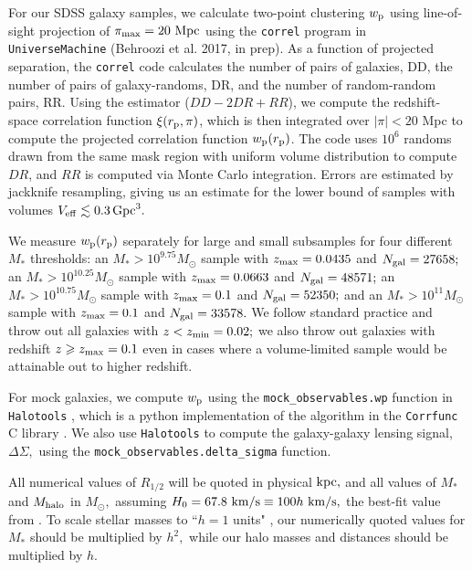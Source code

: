 \documentclass[usenatbib,usegraphicx,letterpaper]{mn2e}
\newcommand{\rhalf}{R_{1/2}}
\newcommand{\mstar}{M_{\ast}}
\newcommand{\mhalo}{M_{\rm halo}}
\newcommand{\rproj}{r_{\rm p}}
\newcommand{\wproj}{w_{\rm p}}
\newcommand{\kpc}{{\rm kpc}}
\newcommand{\mpc}{{\rm Mpc}}
\newcommand{\msun}{M_\odot}
\newcommand{\kms}{{\rm km/s}}
\begin{document}
For our SDSS galaxy samples, we calculate two-point clustering $\wproj$ using line-of-sight projection of $\pi_{\rm max}=20~\mpc$ using the {\tt correl} program in {\tt UniverseMachine} (Behroozi et al. 2017, in prep). As a function of projected separation, the {\tt correl} code calculates the number of pairs of galaxies, DD, the number of pairs of galaxy-randoms, DR, and the number of random-random pairs, RR. Using the \citet{landy_szalay93} estimator ($DD - 2DR + RR$), we compute the redshift-space correlation function $\xi(\rproj, \pi)$, which is then integrated over $\vert\pi\vert < 20$ Mpc to compute the projected correlation function $\wproj(\rproj)$.  The code uses $10^6$ randoms drawn from the same mask region with uniform volume distribution to compute $DR$, and $RR$ is computed via Monte Carlo integration. Errors are estimated by jackknife resampling, giving us an estimate for the lower bound of samples with volumes $V_{\rm eff}\lesssim 0.3\,{\rm Gpc}^3.$

We measure $\wproj(\rproj)$ separately for large and small subsamples for four different $\mstar$ thresholds: an  $\mstar>10^{9.75}\msun$ sample with $z_{\rm max}=0.0435$ and $N_{\rm gal}=27658;$ an  $\mstar>10^{10.25}\msun$ sample with $z_{\rm max}=0.0663$ and $N_{\rm gal}=48571;$ 
an  $\mstar>10^{10.75}\msun$ sample with $z_{\rm max}=0.1$ and $N_{\rm gal}=52350;$ 
and an  $\mstar>10^{11}\msun$ sample with $z_{\rm max}=0.1$ and $N_{\rm gal}=33578.$ We follow standard practice \citep[e.g.,][]{zehavi_etal11} and throw out all galaxies with $z<z_{\rm min}=0.02;$ we also throw out galaxies with redshift $z \geq z_{\rm max}=0.1$ even in cases where a volume-limited sample would be attainable out to higher redshift. 

For mock galaxies, we compute $\wproj$ using the {\tt mock\_observables.wp} function in {\tt Halotools} \citep{hearin_etal16}, which is a python implementation of the algorithm in the {\tt Corrfunc} C library \citep{sinha_etal17}. We also use {\tt Halotools} to compute the galaxy-galaxy lensing signal, $\Delta\Sigma,$ using the {\tt mock\_observables.delta\_sigma} function.

All numerical values of $\rhalf$ will be quoted in physical $\kpc,$ and all values of $\mstar$ and $\mhalo$ in $\msun,$ assuming $H_0=67.8~\kms\equiv100h~\kms,$ the best-fit value from \citet{planck15}. To scale stellar masses to ``$h=1$ units" \citep{croton13}, our numerically quoted values for $\mstar$ should be multiplied by $h^2,$ while our halo masses and distances should be multiplied by $h.$
\end{document}
